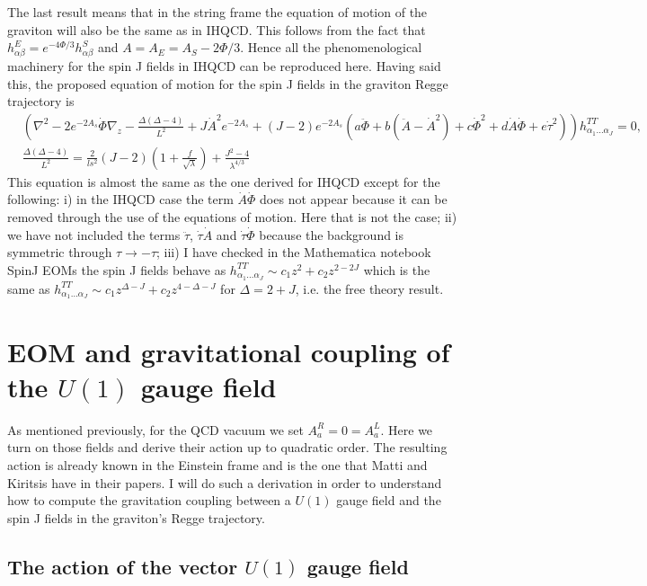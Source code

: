 \documentclass[a4paper,12pt]{article}
\begin{document}
The last result means that in the string frame the equation of motion of the graviton will also be the same as in IHQCD. This follows from the fact that $h^E_{\alpha \beta} = e^{- 4 \Phi / 3} h^S_{\alpha \beta}$ and $A = A_E = A_S - 2 \Phi / 3$. Hence all the phenomenological machinery for the spin J fields in IHQCD can be reproduced here. Having said this,
the proposed equation of motion for the spin J fields in the graviton Regge trajectory is
\begin{align}
&\left( \nabla^2 - 2 e^{-2A_s} \dot{\Phi} \nabla_z - \frac{\Delta ( \Delta - 4 )}{L^2} + J {\dot{A}}^2 e^{-2A_s} + \left( J - 2\right) e^{-2A_s} \left( a \ddot{\Phi} + b \left( \ddot{A} - {\dot{A}}^2 \right) + c {\dot{\Phi}}^2 + d \dot{A} \dot{\Phi} + e {\dot{\tau}}^2  \right)\right) h^{TT}_{\alpha_1 \dots \alpha_J} = 0, \\
&\frac{\Delta ( \Delta - 4 )}{L^2}  = \frac{2}{ls^2} \left(J - 2 \right) \left( 1 + \frac{f}{\sqrt{\lambda}} \right) + \frac{J^2 -4}{\lambda^{4/3}}
\end{align}
This equation is almost the same as the one derived for IHQCD except for the following: i) in the IHQCD case the term $\dot{A} \dot{\Phi}$ does not appear because it can be removed through the use of the equations of motion. Here that is not the case; ii) we have not included the terms $\ddot{\tau}$, $\dot{\tau} \dot{A}$ and $\dot{\tau} \dot{\Phi}$ because the background is symmetric through $\tau \rightarrow - \tau$; iii) I have checked in the Mathematica notebook SpinJ EOMs the spin J fields behave as $h^{TT}_{\alpha_1 \dots \alpha_J} \sim c_1 z^2 + c_2 z^{2-2 J}$ which is the same as  $h^{TT}_{\alpha_1 \dots \alpha_J} \sim c_1 z^{\Delta - J} + c_2 z^{4 - \Delta -J}$ for $\Delta = 2 + J$, i.e. the free theory result.

\section{EOM and gravitational coupling of the $U(1)$ gauge field}

As mentioned previously, for the QCD vacuum we set $A^R_a = 0 = A^L_a$. Here we turn on those fields and derive their action up to quadratic order. The resulting action is already known in the Einstein frame and is the one that Matti and Kiritsis have in their papers. I will do such a derivation in order to understand how to compute the gravitation coupling between a $U(1)$ gauge field and the spin J fields in the graviton's Regge trajectory.

\subsection{The action of the vector $U(1)$ gauge field}
\end{document}
